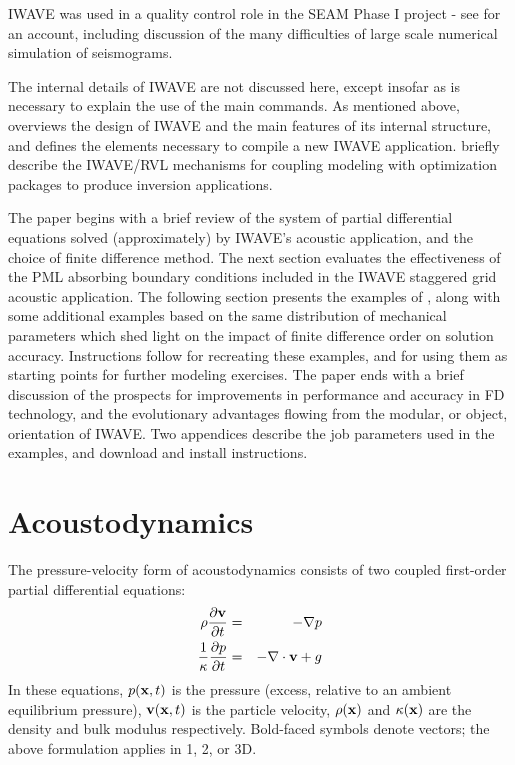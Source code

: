 IWAVE was used in a quality control role in the SEAM Phase I project -
see \cite{FehlerKeliher:11} for an account, including discussion of
the many difficulties of large scale numerical simulation of seismograms.

The internal details of IWAVE are not discussed here, except insofar
as is necessary to explain the use of the main
commands. As mentioned above, \cite{trip14:struct} overviews the design
of IWAVE and the main features of its internal
structure, and defines the elements necessary to compile a new IWAVE application. \cite{GeoPros:11} briefly describe the IWAVE/RVL
mechanisms for coupling modeling with optimization packages
to produce inversion applications.

The paper begins with a brief review of the system of partial
differential equations solved (approximately) by IWAVE's acoustic
application, and the choice of finite difference method. The next
section evaluates the effectiveness of the PML absorbing boundary
conditions included in the IWAVE staggered grid acoustic application.
The following section presents the examples of \cite{SymesVdovina:09},
along with some additional examples based on the same distribution of
mechanical parameters which shed light on the impact of finite
difference order on solution accuracy. Instructions follow for recreating
these examples, and for using them as starting points for further
modeling exercises. The paper ends with a brief discussion of the
prospects for improvements in performance and accuracy in FD
technology, and the evolutionary advantages flowing from the modular,
or object, orientation of IWAVE. Two appendices describe the job
parameters used in the examples, and download and install
instructions.
 
\section{Acoustodynamics}
The pressure-velocity form of
acoustodynamics consists of two coupled first-order partial
differential equations:
\begin{eqnarray}
\label{awe}
\rho \frac{\partial {\bf v}}{\partial t} &=& - \nabla p \\
\frac{1}{\kappa}\frac{\partial p}{\partial t} &=& -\nabla \cdot {\bf v} + g
\end{eqnarray}
In these equations, $p({\bf x},t)$ is the pressure (excess, relative to an
ambient equilibrium pressure), ${\bf v}({\bf x},t)$ is the particle velocity,
$\rho({\bf x})$ and $\kappa({\bf x})$ are the density and bulk modulus
respectively. Bold-faced symbols denote vectors; the above formulation
applies in 1, 2, or 3D.

